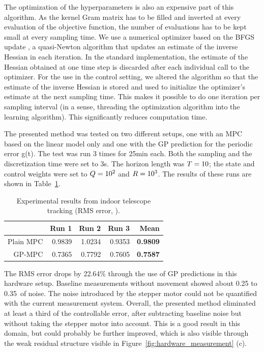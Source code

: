 The optimization of the hyperparameters is also an expensive part of this
algorithm. As the kernel Gram matrix has to be filled and inverted at every
evaluation of the objective function, the number of evaluations has to be kept
small at every sampling time. We use a numerical optimizer based on the BFGS
update
%
%
%
%
, a quasi-Newton algorithm that updates an
estimate of the inverse Hessian in each iteration. In the standard
implementation, the estimate of the Hessian obtained at one time step is
discarded after each individual call to the optimizer. For the use in the
control setting, we altered the algorithm so that the estimate of the inverse
Hessian is stored and used to initialize the optimizer's estimate at the next
sampling time. This makes it possible to do one iteration per sampling interval
(in a sense, threading the optimization algorithm into the learning algorithm).
This significantly reduces computation time.

The presented method was tested on two different setups, one with an MPC based
on the linear model only and one with the GP prediction for the periodic error
g(t). The test was run 3 times for 25\unit{min} each. Both the sampling and the
discretization time were set to 3\unit{s}. The horizon length was $T=10$; the
state and control weights were set to $Q=10^2$ and $R=10^3$. The results of
these runs are shown in Table~\ref{tab:results-hardware}.

\begin{table}[ht]
{\centering
\footnotesize
\begin{tabular}{@{} r *4{r} @{}}
\toprule
          & Run 1  & Run 2  & Run 3  & {\bfseries Mean}   \\
\midrule
Plain MPC & 0.9839 & 1.0234 & 0.9353 & {\bfseries 0.9809} \\
GP-MPC    & 0.7365 & 0.7792 & 0.7605 & {\bfseries 0.7587} \\
\bottomrule
\end{tabular}
\vskip 0.1in
\caption[Experimental results from indoor telescope tracking.]{Experimental
results from indoor telescope tracking (RMS error, \as).}
\label{tab:results-hardware}
}
\end{table}

The RMS error drops by 22.64\unit{\%} through the use of GP predictions in this
hardware setup. Baseline measurements without movement showed about 0.25 to
0.35\as~of noise. The noise introduced by the stepper motor could not be
quantified with the current measurement system. Overall, the presented method
eliminated at least a third of the controllable error, after subtracting
baseline noise but without taking the stepper motor into account. This is a
good result in this domain, but could probably be further improved, which is
also visible through the weak residual structure visible in
Figure~\ref{fig:hardware_measurement} (c).

